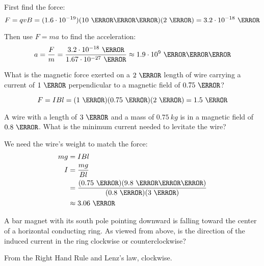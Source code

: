 \documentclass[fleqn,addpoints]{exam}
\begin{document}
\begin{questions}
\begin{solution}
First find the force:
\[
  F = qvB = (1.6 \cdot 10^{-19})(10 \ \meter \per \second)(2 \ \tesla) = 3.2 \cdot 10^{-18} \ \newton
\]

Then use $F = ma$ to find the acceleration:
\[
  a = \frac{F}{m} = \frac{3.2 \cdot 10^{-18} \ \newton}{1.67 \cdot 10^{-27} \ \kilogram} 
    \approx 1.9 \cdot 10^9 \ \meter \per \second
\]
\end{solution}

\question[5]
What is the magnetic force exerted on a $2 \ \meter$ length of wire carrying a current of $1 \ \ampere$ perpendicular to
a magnetic field of $0.75 \ \tesla$?

\begin{solution}
\[
  F = IBl = (1 \ \ampere)(0.75 \ \tesla)(2 \ \meter) = 1.5 \ \newton
\]
\end{solution}


\question[5]
A wire with a length of $3 \ \meter$ and a mass of $0.75 \ kg$ is in a magnetic field of $0.8 \ \tesla$.  What is the
minimum current needed to levitate the wire?

\begin{solution}
We need the wire's weight to match the force:
\begin{align*}
  mg &= IBl \\
  I  &= \frac{mg}{Bl} \\
     &= \frac{(0.75 \ \kg)(9.8 \ \meter \per \second)}{(0.8 \ \tesla)(3 \ \meter)} \\
     &\approx 3.06 \ \ampere \\
\end{align*}
\end{solution}


\question[5]
A bar magnet with its south pole pointing downward is falling toward the center of a horizontal conducting ring.  As
viewed from above, is the direction of the induced current in the ring clockwise or counterclockwise?

\begin{solution}
From the Right Hand Rule and Lenz's law, clockwise.
\end{solution}


\end{questions}
\end{document}
